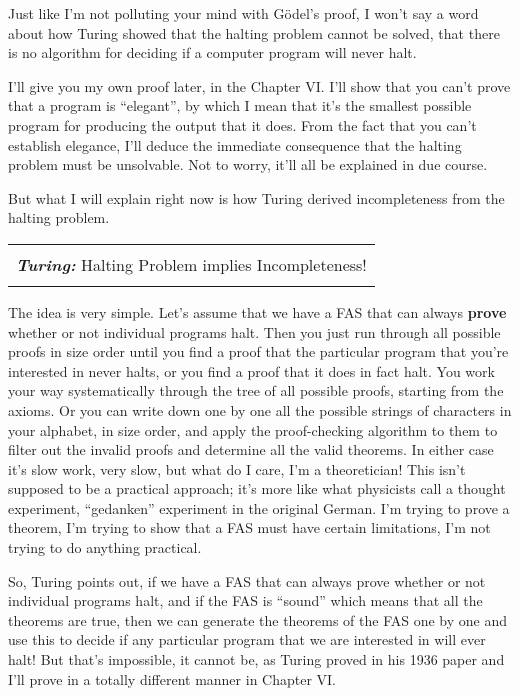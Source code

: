 \documentclass[12pt]{book}
\begin{document}
Just like I'm not polluting your mind with G\"odel's proof, I won't say a word about
how Turing showed that the halting problem cannot be solved, that there is no algorithm
for deciding if a computer program will never halt.

I'll give you my own proof later, in the Chapter VI. 
I'll show that you can't prove that a program is ``elegant'', by which I mean that it's the smallest 
possible program
for producing the output that it does.
From the fact that you can't establish elegance,
I'll deduce the immediate consequence that the halting problem must be unsolvable.
Not to worry, it'll all be explained in due course.

But what I will explain right now is how
Turing derived incompleteness from the halting problem.  

\begin{center}
\begin{tabular}{|c|}
\hline
\\
\textbf{\emph{\large Turing:}} Halting Problem implies Incompleteness!
\\
\\
\hline
\end{tabular}
\end{center}

The idea is very simple.
Let's assume that we have a FAS that can always \textbf{prove} whether or not individual programs
halt.  Then you just run through all possible proofs in size order until you 
find a proof that the particular program that you're interested in never halts, or you
find a proof that it does in fact halt.  You work your way systematically through
the tree of all possible proofs, starting from the axioms. Or you can write down one by one
all the possible strings of characters in your alphabet, in size order, and apply the
proof-checking algorithm to them to filter out the invalid proofs and determine all
the valid theorems.  In either case it's slow work, very slow, 
but what do I care, I'm a theoretician!
This isn't supposed to be a practical approach; 
it's more like what physicists call a thought experiment,
``gedanken'' experiment in the original German.
I'm trying to prove a theorem, 
I'm trying to show that a FAS must have certain limitations, I'm not trying to do anything practical.

So, Turing points out, if we have a FAS that can always prove whether or not individual
programs halt, and if the FAS is ``sound'' which means that all the theorems are true, then
we can generate the theorems of the FAS one by one and use this to decide if any
particular program that we are interested in will ever halt!  But that's impossible, it cannot be,
as Turing proved in his 1936 paper and I'll prove in a totally different manner in Chapter VI.
\end{document}
